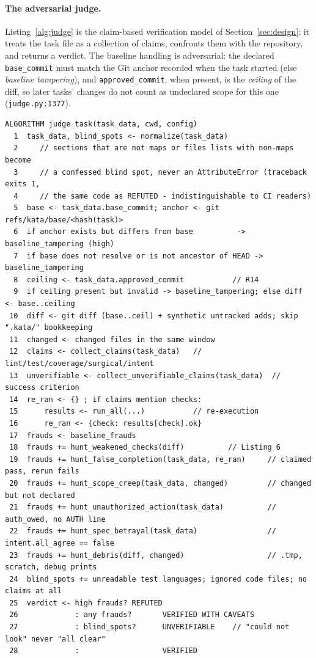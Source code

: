 \documentclass{sbc2019}%
\begin{document}
\paragraph{The adversarial judge.} Listing~\ref{alg:judge} is the
claim-based verification model of Section~\ref{sec:design}: it treats the
task file as a collection of claims, confronts them with the repository,
and returns a verdict. The baseline handling is adversarial: the declared
\texttt{base\_commit} must match the Git anchor recorded when the task
started (else \emph{baseline tampering}), and \texttt{approved\_commit},
when present, is the \emph{ceiling} of the diff, so later tasks' changes
do not count as undeclared scope for this one (\texttt{judge.py:1377}).

\begin{lstlisting}[caption=adversarial judge (kata/judge.py).,label=alg:judge]
ALGORITHM judge_task(task_data, cwd, config)
  1  task_data, blind_spots <- normalize(task_data)
  2     // sections that are not maps or files lists with non-maps become
  3     // a confessed blind spot, never an AttributeError (traceback exits 1,
  4     // the same code as REFUTED - indistinguishable to CI readers)
  5  base <- task_data.base_commit; anchor <- git refs/kata/base/<hash(task)>
  6  if anchor exists but differs from base          -> baseline_tampering (high)
  7  if base does not resolve or is not ancestor of HEAD -> baseline_tampering
  8  ceiling <- task_data.approved_commit           // R14
  9  if ceiling present but invalid -> baseline_tampering; else diff <- base..ceiling
 10  diff <- git diff (base..ceil) + synthetic untracked adds; skip ".kata/" bookkeeping
 11  changed <- changed files in the same window
 12  claims <- collect_claims(task_data)   // lint/test/coverage/surgical/intent
 13  unverifiable <- collect_unverifiable_claims(task_data)  // success criterion
 14  re_ran <- {} ; if claims mention checks:
 15      results <- run_all(...)           // re-execution
 16      re_ran <- {check: results[check].ok}
 17  frauds <- baseline_frauds
 18  frauds += hunt_weakened_checks(diff)          // Listing 6
 19  frauds += hunt_false_completion(task_data, re_ran)     // claimed pass, rerun fails
 20  frauds += hunt_scope_creep(task_data, changed)         // changed but not declared
 21  frauds += hunt_unauthorized_action(task_data)          // auth_owed, no AUTH line
 22  frauds += hunt_spec_betrayal(task_data)                // intent.all_agree == false
 23  frauds += hunt_debris(diff, changed)                   // .tmp, scratch, debug prints
 24  blind_spots += unreadable test languages; ignored code files; no claims at all
 25  verdict <- high frauds? REFUTED
 26             : any frauds?       VERIFIED WITH CAVEATS
 27             : blind_spots?      UNVERIFIABLE    // "could not look" never "all clear"
 28             :                   VERIFIED
\end{lstlisting}
\end{document}
